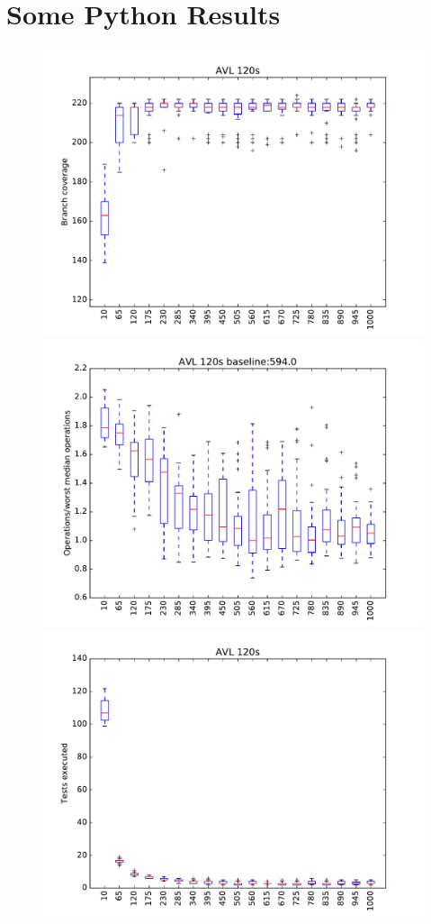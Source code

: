 \section{Some Python Results}



\begin{figure}
\includegraphics[width=\columnwidth]{graphs/AVLrand120}
\includegraphics[width=\columnwidth]{graphs/opsavlrand120}
\includegraphics[width=\columnwidth]{graphs/execavlrand120}

\end{figure}
